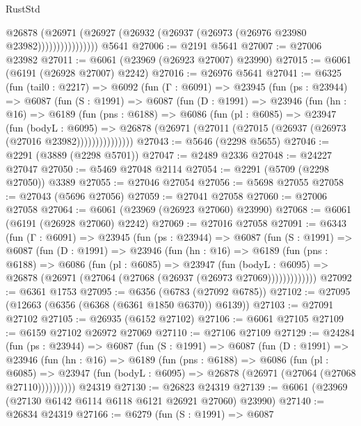\begin{lexlean}{RustStd}
\begin{coremodule}
                      @26878
                        (@26971
                          (@26927 (@26932 (@26937 (@26973 (@26976 @23980 @23982))))))))))))))))
    @5641
@27006 := @2191 @5641
@27007 := @27006 @23982
@27011 := @6061 (@23969 (@26923 @27007) @23990)
@27015 := @6061 (@6191 (@26928 @27007) @2242)
@27016 := @26976 @5641
@27041 := @6325
    (fun (tail0 : @2217) =>
    @6092
      (fun (Γ : @6091) =>
      @23945
        (fun (ps : @23944) =>
        @6087
          (fun (S : @1991) =>
          @6087
            (fun (D : @1991) =>
            @23946
              (fun (hn : @16) =>
              @6189
                (fun (pns : @6188) =>
                @6086
                  (fun (pl : @6085) =>
                  @23947
                    (fun (bodyL : @6095) =>
                    @26878 (@26971 (@27011 (@27015 (@26937 (@26973 (@27016 @23982)))))))))))))))
@27043 := @5646 (@2298 @5655)
@27046 := @2291 (@3889 (@2298 @5701))
@27047 := @2489 @2336
@27048 := @24227 @27047
@27050 := @5469 @27048 @2114
@27054 := @2291 (@5709 (@2298 @27050)) @3389
@27055 := @27046 @27054
@27056 := @5698 @27055
@27058 := @27043 (@5696 @27056)
@27059 := @27041 @27058
@27060 := @27006 @27058
@27064 := @6061 (@23969 (@26923 @27060) @23990)
@27068 := @6061 (@6191 (@26928 @27060) @2242)
@27069 := @27016 @27058
@27091 := @6343
    (fun (Γ : @6091) =>
    @23945
      (fun (ps : @23944) =>
      @6087
        (fun (S : @1991) =>
        @6087
          (fun (D : @1991) =>
          @23946
            (fun (hn : @16) =>
            @6189
              (fun (pns : @6188) =>
              @6086
                (fun (pl : @6085) =>
                @23947
                  (fun (bodyL : @6095) =>
                  @26878 (@26971 (@27064 (@27068 (@26937 (@26973 @27069)))))))))))))
@27092 := @6361 @1753
@27095 := @6356 (@6783 (@27092 @6785))
@27102 := @27095 (@12663 (@6356 (@6368 (@6361 @1850 @6370)) @6139))
@27103 := @27091 @27102
@27105 := @26935 (@6152 @27102)
@27106 := @6061 @27105
@27109 := @6159 @27102 @26972 @27069
@27110 := @27106 @27109
@27129 := @24284
    (fun (ps : @23944) =>
    @6087
      (fun (S : @1991) =>
      @6087
        (fun (D : @1991) =>
        @23946
          (fun (hn : @16) =>
          @6189
            (fun (pns : @6188) =>
            @6086
              (fun (pl : @6085) =>
              @23947 (fun (bodyL : @6095) => @26878 (@26971 (@27064 (@27068 @27110))))))))))
    @24319
@27130 := @26823 @24319
@27139 := @6061 (@23969 (@27130 @6142 @6114 @6118 @6121 @26921 @27060) @23990)
@27140 := @26834 @24319
@27166 := @6279
    (fun (S : @1991) =>
    @6087

\end{coremodule}
\end{lexlean}
